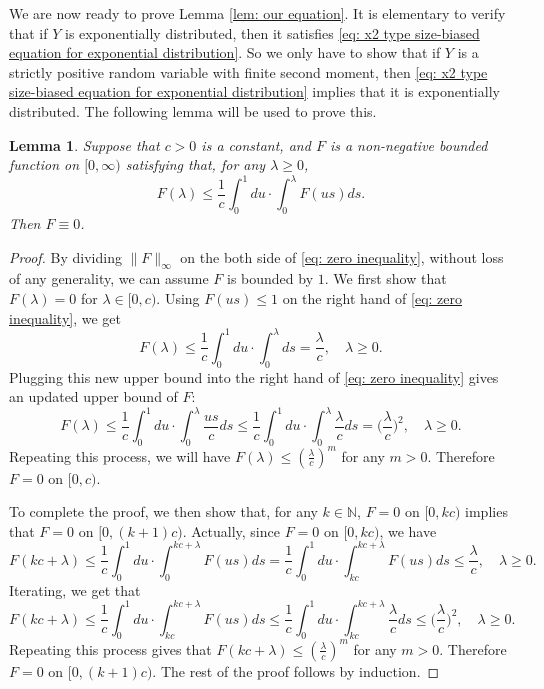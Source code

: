 \documentclass[12pt,a4paper]{amsart}
\newtheorem{lem}[thm]{Lemma}
\numberwithin{equation}{section}
\begin{document}
   We are now ready to prove Lemma \ref{lem: our equation}.
	It is elementary to verify that if $Y$ is exponentially distributed, then it satisfies \eqref{eq: x2 type size-biased equation for exponential distribution}.
	So we only have to show that if $Y$ is a strictly positive random variable with finite second moment, then \eqref{eq: x2 type size-biased equation for exponential distribution} implies that it is exponentially distributed.
	The following lemma will be used to prove this.

\begin{lem}\label{lem: zero inequality}
	Suppose that $c>0$ is a constant, and $F$  is a non-negative bounded function on $[0,\infty)$ satisfying that, for any $\lambda\geq 0$,
\begin{equation}\label{eq: zero inequality}
	F(\lambda)
	\leq
	\frac{1}{c}\int_0^1du
	\cdot
	\int_0^\lambda F(us)ds.
\end{equation}
	Then $F\equiv 0$.
\end{lem}
\begin{proof}
	By dividing $\|F\|_\infty$ on the both side of \eqref{eq: zero inequality},
	without loss of any generality, we can assume $F$ is bounded by $1$.
	We first show that $F(\lambda)=0$ for $\lambda \in [0,c)$.
	Using  $F(us)\leq 1$ on the right hand of \eqref{eq: zero inequality}, we get
	\begin{equation*}
		F(\lambda)
		\leq
		\frac{1}{c}\int_0^1du
		\cdot
		\int_0^\lambda ds
		=
		\frac{\lambda}{c},
		\quad
		\lambda\geq 0.
	\end{equation*}
	Plugging this new upper bound into the right hand of \eqref{eq: zero inequality} gives an updated upper bound of $F$:
	\begin{equation*}
		F(\lambda)
		\leq \frac{1}{c}\int_0^1du \cdot \int_0^\lambda \frac{us}{c}ds \leq \frac{1}{c}\int_0^1du \cdot \int_0^\lambda \frac{\lambda}{c}ds
		= \Big(\frac{\lambda}{c}\Big)^2,
		\quad
		\lambda\geq 0.
	\end{equation*}
	Repeating this process, we will have $F(\lambda)\leq (\frac{\lambda}{c})^m$ for any $m>0$. Therefore $F=0$ on $[0,c)$.
	
	To complete the proof, we then show that, for any $k\in\mathbb N$, $F=0$ on $[0,kc)$ implies that $F=0$ on $[0,(k+1)c)$.
	Actually, since $F=0$ on $[0,kc)$, we have
	\begin{equation*}
		F ( k c + \lambda )
		\leq
		\frac { 1 } { c } \int_0^1 du \cdot \int_0^{ k c + \lambda } F ( u s ) ds
		=
		\frac{1}{c}\int_0^1du\cdot\int_{kc}^{kc+\lambda}
		F(us)ds\leq\frac{\lambda}{c}, \quad \lambda\geq 0.
	\end{equation*}
	Iterating, we get that
	\begin{equation*}
		F(kc+\lambda)
		\leq
		\frac{1}{c}\int_0^1du\cdot\int_{kc}^{kc+\lambda} F(us)ds
		\leq
		\frac{1}{c}\int_0^1du\cdot\int_{kc}^{kc+\lambda} \frac{\lambda}{c}ds
		\leq
		\Big(\frac{\lambda}{c}\Big)^2, \quad \lambda\geq 0.
	\end{equation*}
	Repeating this process gives that $F(kc+\lambda)\leq (\frac{\lambda}{c})^m$ for any $m>0$. Therefore $F=0$ on $[0,(k+1)c)$. The rest of the proof follows by induction.
\end{proof}
\end{document}

